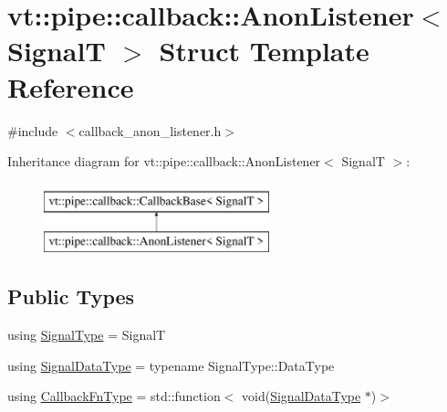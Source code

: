 \hypertarget{structvt_1_1pipe_1_1callback_1_1_anon_listener}{}\section{vt\+:\+:pipe\+:\+:callback\+:\+:Anon\+Listener$<$ SignalT $>$ Struct Template Reference}
\label{structvt_1_1pipe_1_1callback_1_1_anon_listener}


{\ttfamily \#include $<$callback\+\_\+anon\+\_\+listener.\+h$>$}

Inheritance diagram for vt\+:\+:pipe\+:\+:callback\+:\+:Anon\+Listener$<$ SignalT $>$\+:\begin{figure}[H]
\begin{center}
\leavevmode
\includegraphics[height=2.000000cm]{structvt_1_1pipe_1_1callback_1_1_anon_listener}
\end{center}
\end{figure}
\subsection*{Public Types}
\begin{DoxyCompactItemize}
\item 
using \hyperlink{structvt_1_1pipe_1_1callback_1_1_anon_listener_ac2b8793106d8e11c7e7ee257627ace73}{Signal\+Type} = SignalT
\item 
using \hyperlink{structvt_1_1pipe_1_1callback_1_1_anon_listener_a26182294e0b15bb16dd94040bb47ed73}{Signal\+Data\+Type} = typename Signal\+Type\+::\+Data\+Type
\item 
using \hyperlink{structvt_1_1pipe_1_1callback_1_1_anon_listener_ad5d8a2cc6a1599642855e92bbd10f89c}{Callback\+Fn\+Type} = std\+::function$<$ void(\hyperlink{structvt_1_1pipe_1_1callback_1_1_anon_listener_a26182294e0b15bb16dd94040bb47ed73}{Signal\+Data\+Type} $\ast$)$>$
\end{DoxyCompactItemize}
